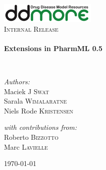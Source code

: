 \begin{titlepage}
\begin{center}

\includegraphics[width=0.35\textwidth]{./logo/ddmore_logo}~\\[1cm]

%
\textsc{\Large Internal Release}\\[0.5cm]

\HRule \\[0.4cm]
{ \huge \bfseries Extensions in PharmML 0.5 \\[0.4cm] }

\HRule \\[1.5cm]

\begin{minipage}{0.5\textwidth}
\begin{flushleft} \large
\emph{Authors:}\\
Maciek J \textsc{Swat}\\
Sarala \textsc{Wimalaratne}\\
Niels Rode \textsc{Kristensen}
\end{flushleft}
\end{minipage}
\begin{minipage}{0.4\textwidth}
\begin{flushright} \large
\emph{with contributions from:} \\
Roberto \textsc{Bizzotto} \\
Marc \textsc{Lavielle}
\end{flushright}
\end{minipage}



\vfill

{\large \today \\}

\end{center}
\end{titlepage}